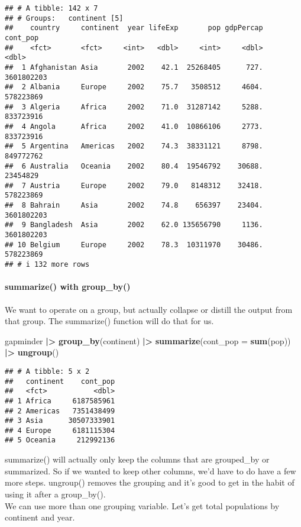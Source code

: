 \documentclass[
]{article}
\newenvironment{Shaded}{\begin{snugshade}}{\end{snugshade}}
\newcommand{\AttributeTok}[1]{\textcolor[rgb]{0.13,0.29,0.53}{#1}}
\newcommand{\FunctionTok}[1]{\textcolor[rgb]{0.13,0.29,0.53}{\textbf{#1}}}
\newcommand{\NormalTok}[1]{#1}
\newcommand{\SpecialCharTok}[1]{\textcolor[rgb]{0.81,0.36,0.00}{\textbf{#1}}}
\begin{document}
\begin{verbatim}
## # A tibble: 142 x 7
## # Groups:   continent [5]
##    country     continent  year lifeExp       pop gdpPercap   cont_pop
##    <fct>       <fct>     <int>   <dbl>     <int>     <dbl>      <dbl>
##  1 Afghanistan Asia       2002    42.1  25268405      727. 3601802203
##  2 Albania     Europe     2002    75.7   3508512     4604.  578223869
##  3 Algeria     Africa     2002    71.0  31287142     5288.  833723916
##  4 Angola      Africa     2002    41.0  10866106     2773.  833723916
##  5 Argentina   Americas   2002    74.3  38331121     8798.  849772762
##  6 Australia   Oceania    2002    80.4  19546792    30688.   23454829
##  7 Austria     Europe     2002    79.0   8148312    32418.  578223869
##  8 Bahrain     Asia       2002    74.8    656397    23404. 3601802203
##  9 Bangladesh  Asia       2002    62.0 135656790     1136. 3601802203
## 10 Belgium     Europe     2002    78.3  10311970    30486.  578223869
## # i 132 more rows
\end{verbatim}

\paragraph{summarize() with group\_by()}\label{summarize-with-group_by}

We want to operate on a group, but actually collapse or distill the
output from that group. The summarize() function will do that for us.

\begin{Shaded}
\begin{Highlighting}[]
\NormalTok{gapminder }\SpecialCharTok{|\textgreater{}}
 \FunctionTok{group\_by}\NormalTok{(continent) }\SpecialCharTok{|\textgreater{}}
 \FunctionTok{summarize}\NormalTok{(}\AttributeTok{cont\_pop =} \FunctionTok{sum}\NormalTok{(pop)) }\SpecialCharTok{|\textgreater{}}
 \FunctionTok{ungroup}\NormalTok{()}
\end{Highlighting}
\end{Shaded}

\begin{verbatim}
## # A tibble: 5 x 2
##   continent    cont_pop
##   <fct>           <dbl>
## 1 Africa     6187585961
## 2 Americas   7351438499
## 3 Asia      30507333901
## 4 Europe     6181115304
## 5 Oceania     212992136
\end{verbatim}

summarize() will actually only keep the columns that are grouped\_by or
summarized. So if we wanted to keep other columns, we'd have to do have
a few more steps. ungroup() removes the grouping and it's good to get in
the habit of using it after a group\_by().\\
We can use more than one grouping variable. Let's get total populations
by continent and year.
\end{document}
